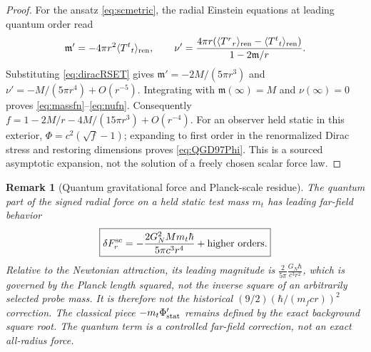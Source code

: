 \documentclass[11pt,a4paper]{article}
\newtheorem{remark}[theorem]{Remark}
\begin{document}
\begin{proof}
For the ansatz \eqref{eq:scmetric}, the radial Einstein equations
at leading quantum order read
\begin{equation}\label{eq:scEFE}
\mathfrak m'=-4\pi r^2\langle T^t{}_t\rangle_{\rm ren},
\qquad
\nu'=\frac{4\pi r
(\langle T^r{}_r\rangle_{\rm ren}
-\langle T^t{}_t\rangle_{\rm ren})}
{1-2\mathfrak m/r}.
\end{equation}
Substituting \eqref{eq:diracRSET} gives
$\mathfrak m'=-2M/(5\pi r^3)$ and
$\nu'=-M/(5\pi r^4)+O(r^{-5})$.
Integrating with $\mathfrak m(\infty)=M$ and $\nu(\infty)=0$
proves \eqref{eq:massfn}--\eqref{eq:nufn}.  Consequently
$f=1-2M/r-4M/(15\pi r^3)+O(r^{-4})$.
For an observer held static in this exterior,
$\Phi=c^2(\sqrt{f}-1)$; expanding to first order in the
renormalized Dirac stress and restoring dimensions proves
\eqref{eq:QGD97Phi}.  This is a sourced asymptotic expansion,
not the solution of a freely chosen scalar force law.
\end{proof}

\begin{remark}[Quantum gravitational force and Planck-scale residue]
The \emph{quantum part} of the signed radial force on a held static
test mass $m_t$ has leading far-field behavior
\begin{equation}\label{eq:scforce}
\boxed{\delta F_r^{\rm sc}
=-\frac{2G_N^2Mm_t\hbar}{5\pi c^3r^4}
+\text{higher orders}.}
\end{equation}
Relative to the Newtonian attraction, its leading magnitude is
$\frac{2}{5\pi}\frac{G_N\hbar}{c^3r^2}$,
which is governed by the Planck length squared, not the inverse
square of an arbitrarily selected probe mass.  It is therefore
\emph{not} the historical $(9/2)(\hbar/(m_fc r))^2$ correction.
The classical piece $-m_t\Phi_{\rm stat}'$ remains defined by the
exact background square root.  The quantum term is a controlled
far-field correction, not an exact all-radius force.
\end{remark}
\end{document}
